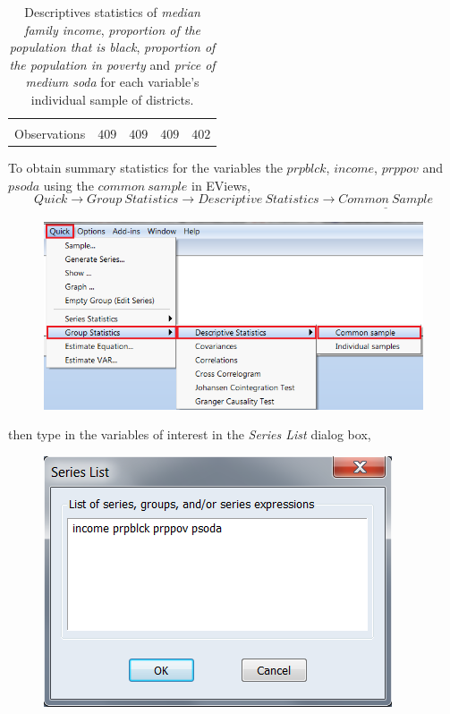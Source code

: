 \documentclass[12pt]{report}
\begin{document}
\begin{table}[H]
\begin{tabular}{lrrrr}
		\multicolumn{1}{c}{}&\multicolumn{1}{c}{}&\multicolumn{1}{c}{}&\multicolumn{1}{c}{}&\multicolumn{1}{c}{}\\
		\multicolumn{1}{l}{Observations}&\multicolumn{1}{c}{$409$}&\multicolumn{1}{c}{$409$}&\multicolumn{1}{c}{$409$}&\multicolumn{1}{c}{$402$}\\
	\end{tabular}
	\caption{Descriptives statistics of \textit{median family income}, \textit{proportion of the population that is black}, \textit{proportion of the population in poverty} and \textit{price of medium soda} for each variable's individual sample of districts.}
	\label{tbl:desstat}
\end{table}
\vspace{-\baselineskip}

\noindent To obtain summary statistics for the variables the $prpblck$, $income$, $prppov$ and $psoda$ using the $common\ sample$ in EViews,
$$Quick \to Group\ Statistics \to Descriptive\ Statistics \to \underline{Common\ Sample}$$
\begin{figure}[H]
	\centering
	\includegraphics{tute5_29}
\end{figure}
\vspace{-\baselineskip}
\noindent then type in the variables of interest in the \textit{Series List} dialog box,
\begin{figure}[H]
	\centerline{\includegraphics{tute5_10}}
\end{figure}
\end{document}
